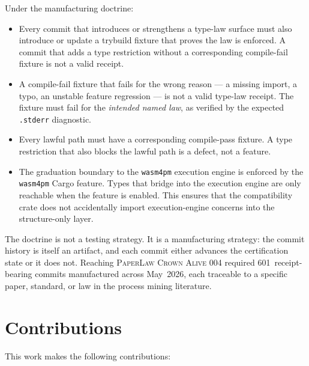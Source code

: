 Under the manufacturing doctrine:

\begin{itemize}
  \item Every commit that introduces or strengthens a type-law surface must
        also introduce or update a trybuild fixture that proves the law is
        enforced. A commit that adds a type restriction without a corresponding
        compile-fail fixture is not a valid receipt.
  \item A compile-fail fixture that fails for the wrong reason --- a missing
        import, a typo, an unstable feature regression --- is not a valid
        type-law receipt. The fixture must fail for the \emph{intended named
        law}, as verified by the expected \texttt{.stderr} diagnostic.
  \item Every lawful path must have a corresponding compile-pass fixture. A
        type restriction that also blocks the lawful path is a defect, not a
        feature.
  \item The graduation boundary to the \texttt{wasm4pm} execution engine is
        enforced by the \texttt{wasm4pm} Cargo feature. Types that bridge into
        the execution engine are only reachable when the feature is enabled.
        This ensures that the compatibility crate does not accidentally import
        execution-engine concerns into the structure-only layer.
\end{itemize}

The doctrine is not a testing strategy. It is a manufacturing strategy: the
commit history is itself an artifact, and each commit either advances the
certification state or it does not. Reaching
\textsc{PaperLaw Crown Alive 004} required 601~receipt-bearing commits
manufactured across May~2026, each traceable to a specific paper, standard, or
law in the process mining literature.

\section{Contributions}
\label{sec:intro-contributions}

This work makes the following contributions:

